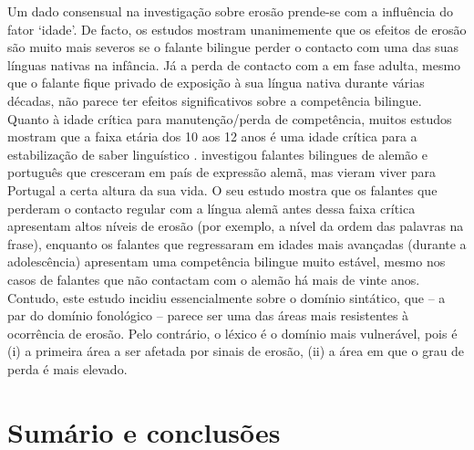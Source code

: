 \documentclass[output=paper]{LSP/langsci}
\begin{document}
Um dado consensual na investigação sobre erosão prende-se com a influência do fator `idade'. De facto, os estudos mostram unanimemente que os efeitos de erosão são muito mais severos se o falante bilingue perder o contacto com uma das suas línguas nativas na infância. Já a perda de contacto com a  em fase adulta, mesmo que o falante fique privado de exposição à sua língua nativa durante várias décadas, não parece ter efeitos significativos sobre a competência bilingue. Quanto à idade crítica para manutenção/perda de competência, muitos estudos mostram que a faixa etária dos 10 aos 12 anos é uma idade crítica para a estabilização de saber linguístico \citep{bylund2009,flores2008}. \cite{flores2008} investigou falantes bilingues de alemão e português que cresceram em país de expressão alemã, mas vieram viver para Portugal a certa altura da sua vida. O seu estudo mostra que os falantes que perderam o contacto regular com a língua alemã antes dessa faixa crítica apresentam altos níveis de erosão (por exemplo, a nível da ordem das palavras na frase), enquanto os falantes que regressaram em idades mais avançadas (durante a adolescência) apresentam uma competência bilingue muito estável, mesmo nos casos de falantes que não contactam com o alemão há mais de vinte anos. Contudo, este estudo incidiu essencialmente sobre o domínio sintático, que -- a par do domínio fonológico -- parece ser uma das áreas mais resistentes à ocorrência de erosão. Pelo contrário, o léxico é o domínio mais vulnerável, pois é (i) a primeira área a ser afetada por sinais de erosão, (ii) a área em que o grau de perda é mais elevado. 

\section{Sumário e conclusões}%
\label{sec:almeida_sumario}
\end{document}
